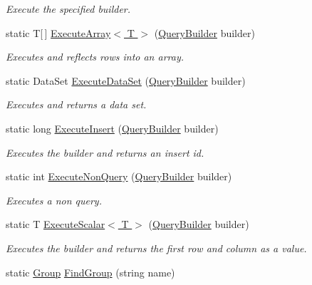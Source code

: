 \begin{DoxyCompactItemize}
\begin{DoxyCompactList}\small\item\em Execute the specified builder. \end{DoxyCompactList}\item 
static T\mbox{[}$\,$\mbox{]} \hyperlink{classOTA_1_1Data_1_1Storage_abccea4260a77f89ddbea6238139ea94e}{Execute\+Array$<$ T $>$} (\hyperlink{classOTA_1_1Data_1_1QueryBuilder}{Query\+Builder} builder)
\begin{DoxyCompactList}\small\item\em Executes and reflects rows into an array. \end{DoxyCompactList}\item 
static Data\+Set \hyperlink{classOTA_1_1Data_1_1Storage_a3b69a24f0c47513b72aa71c77a66124a}{Execute\+Data\+Set} (\hyperlink{classOTA_1_1Data_1_1QueryBuilder}{Query\+Builder} builder)
\begin{DoxyCompactList}\small\item\em Executes and returns a data set. \end{DoxyCompactList}\item 
static long \hyperlink{classOTA_1_1Data_1_1Storage_af15c736688ce016b946a53ed07b860c4}{Execute\+Insert} (\hyperlink{classOTA_1_1Data_1_1QueryBuilder}{Query\+Builder} builder)
\begin{DoxyCompactList}\small\item\em Executes the builder and returns an insert id. \end{DoxyCompactList}\item 
static int \hyperlink{classOTA_1_1Data_1_1Storage_aa374772fd64b181a5f939159873d6ebe}{Execute\+Non\+Query} (\hyperlink{classOTA_1_1Data_1_1QueryBuilder}{Query\+Builder} builder)
\begin{DoxyCompactList}\small\item\em Executes a non query. \end{DoxyCompactList}\item 
static T \hyperlink{classOTA_1_1Data_1_1Storage_a19466149536c081f98dffa3863d2049b}{Execute\+Scalar$<$ T $>$} (\hyperlink{classOTA_1_1Data_1_1QueryBuilder}{Query\+Builder} builder)
\begin{DoxyCompactList}\small\item\em Executes the builder and returns the first row and column as a value. \end{DoxyCompactList}\item 
static \hyperlink{classOTA_1_1Data_1_1Group}{Group} \hyperlink{classOTA_1_1Data_1_1Storage_a3fe44de8832b93f92e4e77fd65bbee22}{Find\+Group} (string name)

\end{DoxyCompactItemize}
